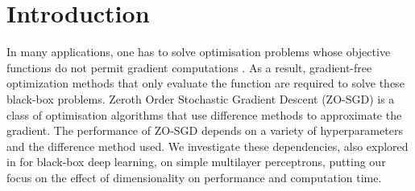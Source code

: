 \section{Introduction}

In many applications, one has to solve optimisation problems whose objective functions do not permit gradient computations \cite{alarie2021two}. As a result, gradient-free optimization methods that only evaluate the function are required to solve these black-box problems. Zeroth Order Stochastic Gradient Descent (ZO-SGD) is a class of optimisation algorithms that use difference methods to approximate the gradient. The performance of ZO-SGD depends on a variety of hyperparameters and the difference method used. We investigate these dependencies, also explored in \cite{liu2020primer} for black-box deep learning, on simple multilayer perceptrons, putting our focus on the effect of dimensionality on performance and computation time.



